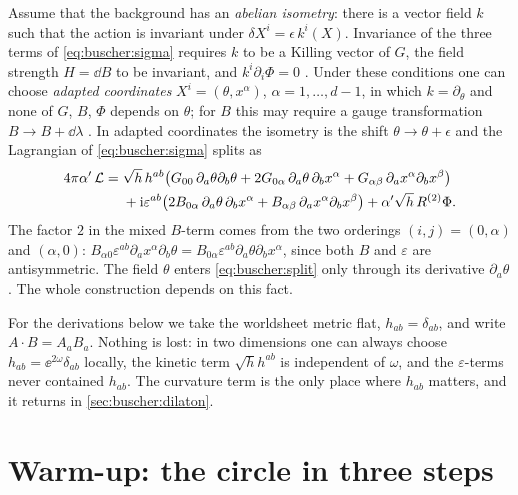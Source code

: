 Assume that the background has an \emph{abelian isometry}: there is a vector
field $k$ such that the action is invariant under $\delta X^i=\epsilon\,k^i(X)$. Invariance of
the three terms of \eqref{eq:buscher:sigma} requires $k$ to be a Killing vector of $G$, the
field strength $H=\dd B$ to be invariant, and $k^i\partial_i\Phi=0$
. Under these conditions one can choose \emph{adapted
coordinates} $X^i=(\theta,x^\alpha)$, $\alpha=1,\dots,d-1$, in which
$k=\partial_\theta$ and none of $G$, $B$, $\Phi$ depends on $\theta$; for $B$ this may require
a gauge transformation $B\to B+\dd\lambda$ . In adapted
coordinates the isometry is the shift $\theta\to\theta+\epsilon$ and the Lagrangian of
\eqref{eq:buscher:sigma} splits as
\begin{align}\label{eq:buscher:split}
 4\pi\alpha'\,\mathcal L={}&\sqrt h\,h^{ab}\big(G_{00}\,\partial_a\theta\partial_b\theta
   +2G_{0\alpha}\,\partial_a\theta\,\partial_bx^\alpha
   +G_{\alpha\beta}\,\partial_ax^\alpha\partial_bx^\beta\big)\notag\\
 &+\mathrm{i}\varepsilon^{ab}\big(2B_{0\alpha}\,\partial_a\theta\,\partial_bx^\alpha
   +B_{\alpha\beta}\,\partial_ax^\alpha\partial_bx^\beta\big)+\alpha'\sqrt h\,R^{(2)}\Phi .
\end{align}
The factor $2$ in the mixed $B$-term comes from the two orderings $(i,j)=(0,\alpha)$ and
$(\alpha,0)$: $B_{\alpha0}\varepsilon^{ab}\partial_ax^\alpha\partial_b\theta
=B_{0\alpha}\varepsilon^{ab}\partial_a\theta\partial_bx^\alpha$, since both $B$ and
$\varepsilon$ are antisymmetric. The field $\theta$ enters \eqref{eq:buscher:split} only
through its derivative $\partial_a\theta$. The whole construction depends on this fact.

For the derivations below we take the worldsheet metric flat, $h_{ab}=\delta_{ab}$, and write
$A\cdot B=A_aB_a$. Nothing is lost: in two dimensions one can always choose
$h_{ab}=\ee^{2\omega}\delta_{ab}$ locally, the kinetic term $\sqrt h h^{ab}$ is independent of
$\omega$, and the $\varepsilon$-terms never contained $h_{ab}$. The curvature term is the only
place where $h_{ab}$ matters, and it returns in \cref{sec:buscher:dilaton}.

\section{Warm-up: the circle in three steps}\label{sec:buscher:circle}

